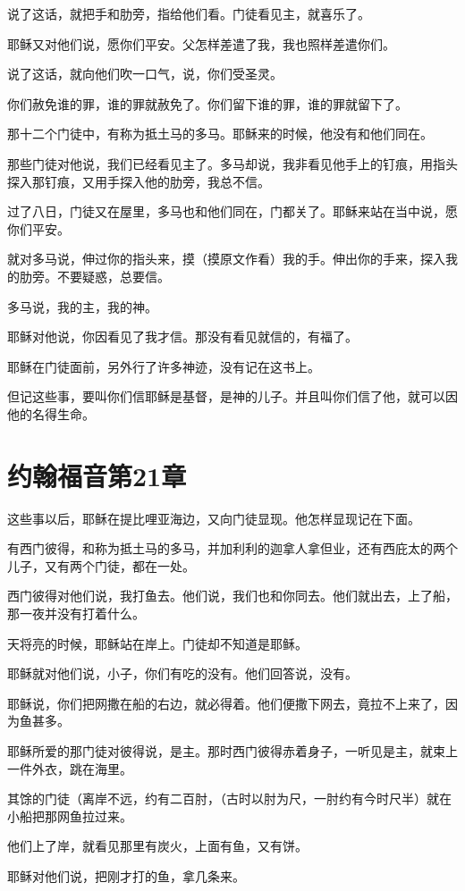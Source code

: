 \documentclass[12pt,oneside]{book}
\begin{document}
说了这话，就把手和肋旁，指给他们看。门徒看见主，就喜乐了。

耶稣又对他们说，愿你们平安。父怎样差遣了我，我也照样差遣你们。

说了这话，就向他们吹一口气，说，你们受圣灵。

你们赦免谁的罪，谁的罪就赦免了。你们留下谁的罪，谁的罪就留下了。

那十二个门徒中，有称为抵土马的多马。耶稣来的时候，他没有和他们同在。

那些门徒对他说，我们已经看见主了。多马却说，我非看见他手上的钉痕，用指头探入那钉痕，又用手探入他的肋旁，我总不信。

过了八日，门徒又在屋里，多马也和他们同在，门都关了。耶稣来站在当中说，愿你们平安。

就对多马说，伸过你的指头来，摸（摸原文作看）我的手。伸出你的手来，探入我的肋旁。不要疑惑，总要信。

多马说，我的主，我的神。

耶稣对他说，你因看见了我才信。那没有看见就信的，有福了。

耶稣在门徒面前，另外行了许多神迹，没有记在这书上。

但记这些事，要叫你们信耶稣是基督，是神的儿子。并且叫你们信了他，就可以因他的名得生命。

\chapter{约翰福音第21章}
这些事以后，耶稣在提比哩亚海边，又向门徒显现。他怎样显现记在下面。

有西门彼得，和称为抵土马的多马，并加利利的迦拿人拿但业，还有西庇太的两个儿子，又有两个门徒，都在一处。

西门彼得对他们说，我打鱼去。他们说，我们也和你同去。他们就出去，上了船，那一夜并没有打着什么。

天将亮的时候，耶稣站在岸上。门徒却不知道是耶稣。

耶稣就对他们说，小子，你们有吃的没有。他们回答说，没有。

耶稣说，你们把网撒在船的右边，就必得着。他们便撒下网去，竟拉不上来了，因为鱼甚多。

耶稣所爱的那门徒对彼得说，是主。那时西门彼得赤着身子，一听见是主，就束上一件外衣，跳在海里。

其馀的门徒（离岸不远，约有二百肘，（古时以肘为尺，一肘约有今时尺半）就在小船把那网鱼拉过来。

他们上了岸，就看见那里有炭火，上面有鱼，又有饼。

耶稣对他们说，把刚才打的鱼，拿几条来。
\end{document}
